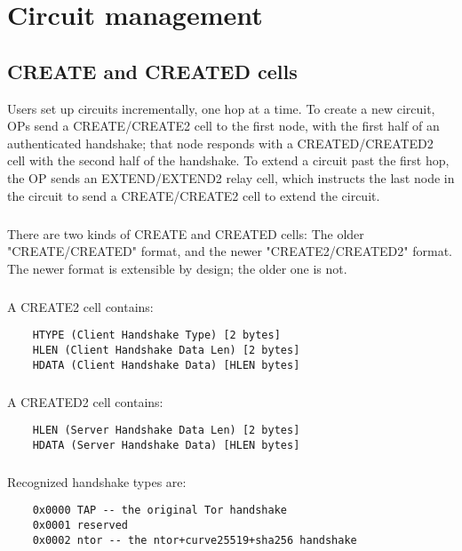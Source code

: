 \chapter{Circuit management}

\section{CREATE and CREATED cells}
Users set up circuits incrementally, one hop at a time. To create a
new circuit, OPs send a CREATE/CREATE2 cell to the first node, with
the first half of an authenticated handshake; that node responds with
a CREATED/CREATED2 cell with the second half of the handshake. To
extend a circuit past the first hop, the OP sends an EXTEND/EXTEND2
relay cell, which instructs the last node in the
circuit to send a CREATE/CREATE2 cell to extend the circuit.

\paragraph{}
There are two kinds of CREATE and CREATED cells: The older
"CREATE/CREATED" format, and the newer "CREATE2/CREATED2" format. The
newer format is extensible by design; the older one is not.

\paragraph{}
A CREATE2 cell contains:

\begin{verbatim}
    HTYPE (Client Handshake Type) [2 bytes]
    HLEN (Client Handshake Data Len) [2 bytes]
    HDATA (Client Handshake Data) [HLEN bytes]
\end{verbatim}

\paragraph{}
A CREATED2 cell contains:

\begin{verbatim}
    HLEN (Server Handshake Data Len) [2 bytes]
    HDATA (Server Handshake Data) [HLEN bytes]
\end{verbatim}

\paragraph{}
Recognized handshake types are:

\begin{verbatim}
    0x0000 TAP -- the original Tor handshake
    0x0001 reserved
    0x0002 ntor -- the ntor+curve25519+sha256 handshake
\end{verbatim}

